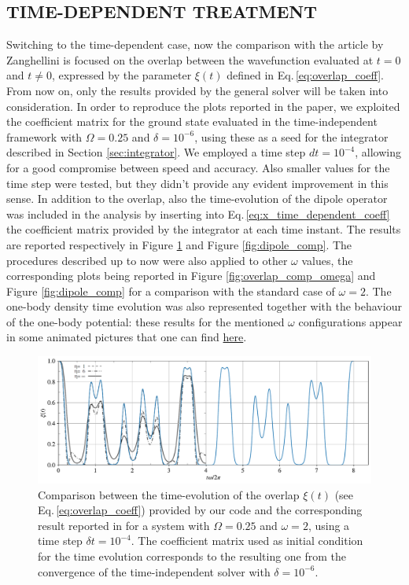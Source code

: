 \subsection{TIME-DEPENDENT TREATMENT}
Switching to the time-dependent case, now the comparison with the article by Zanghellini is focused on the overlap between the wavefunction evaluated at $t=0$ and $t\neq 0$, expressed by the parameter $\xi(t)$ defined in Eq.\,\ref{eq:overlap_coeff}. From now on, only the results provided by the general solver will be taken into consideration. In order to reproduce the plots reported in the paper, we exploited the coefficient matrix for the ground state evaluated in the time-independent framework with $\Omega=0.25$ and $\delta=10^{-6}$, using these as a seed for the integrator described in Section \ref{sec:integrator}. We employed a time step $dt=10^{-4}$, allowing for a good compromise between speed and accuracy. Also smaller values for the time step were tested, but they didn't provide any evident improvement in this sense. In addition to the overlap, also the time-evolution of the dipole operator was included in the analysis by inserting into Eq.\,\ref{eq:x_time_dependent_coeff} the coefficient matrix provided by the integrator at each time instant. The results are reported respectively in Figure \ref{fig:overlap_comp_paper} and Figure \ref{fig:dipole_comp}. The procedures described up to now were also applied to other $\omega$ values, the corresponding plots being reported in Figure \ref{fig:overlap_comp_omega} and Figure \ref{fig:dipole_comp} for a comparison with the standard case of $\omega=2$. The one-body density time evolution was also represented together with the behaviour of the one-body potential: these results for the mentioned $\omega$ configurations appear in some animated pictures that one can find \href{https://github.com/Matteo294/FYS4411/tree/main/Project2/code}{here}.  \\

\begin{figure}[h!]
    \centering
    \includegraphics[scale=0.5]{images/overlap_comp_article.pdf}
    \caption{Comparison between the time-evolution of the overlap $\xi(t)$ (see Eq.\,\ref{eq:overlap_coeff}) provided by our code and the corresponding result reported in \cite{Zanghellini_2004} for a system with $\Omega=0.25$ and $\omega=2$, using a time step $\delta t=10^{-4}$. The coefficient matrix used as initial condition for the time evolution corresponds to the resulting one from the convergence of the time-independent solver with $\delta=10^{-6}$. }
    \label{fig:overlap_comp_paper}
\end{figure}

